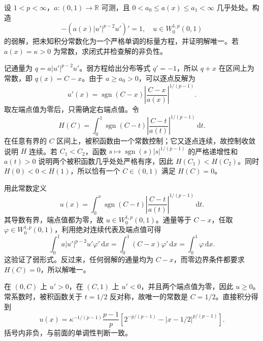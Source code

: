 \begin{exercise}\label{b2:ex:H2-ordered-source}
设 \(1<p<\infty\)，\(a:(0,1)\to\mathbb R\) 可测，且
\(0<a_0\le a(x)\le a_1<\infty\) 几乎处处。构造
\[
 -(a(x)|u'|^{p-2}u')'=1,
 \quad u\in W_0^{1,p}(0,1)
\]
的弱解，把未知积分常数化为一个严格单调的标量方程，并证明解唯一。若 \(a(x)=\kappa>0\) 为常数，求闭式并检查解的非负性。
\end{exercise}
\begin{solution}
记通量为 \(q=a|u'|^{p-2}u'\)。弱方程给出分布等式 \(q'=-1\)，所以 \(q+x\) 在区间上为常数，即 \(q(x)=C-x\)。由于 \(a\ge a_0>0\)，可以逐点反解为
\[
 u'(x)=\operatorname{sgn}(C-x)
       \left|\frac{C-x}{a(x)}\right|^{1/(p-1)}.
\]
取左端点值为零后，只需确定右端点值。令
\[
 H(C)=\int_0^1\operatorname{sgn}(C-t)
                   \left|\frac{C-t}{a(t)}\right|^{1/(p-1)}\,\mathrm dt.
\]
在任意有界的 \(C\) 区间上，被积函数由一个常数控制；它又逐点连续，故控制收敛说明 \(H\) 连续。若 \(C_1<C_2\)，函数 \(s\mapsto\operatorname{sgn}(s)|s|^{1/(p-1)}\) 的严格递增性和 \(a(t)>0\) 说明两个被积函数几乎处处严格有序，因此 \(H(C_1)<H(C_2)\)。同时 \(H(0)<0<H(1)\)，所以恰有一个 \(C\in(0,1)\) 满足 \(H(C)=0\)。

用此常数定义
\[
 u(x)=\int_0^x\operatorname{sgn}(C-t)
                   \left|\frac{C-t}{a(t)}\right|^{1/(p-1)}\,\mathrm dt.
\]
其导数有界，端点值都为零，故 \(u\in W_0^{1,p}(0,1)\)。通量等于 \(C-x\)，任取 \(\varphi\in W_0^{1,p}(0,1)\)，利用绝对连续代表及端点值可得
\[
 \int_0^1a|u'|^{p-2}u'\varphi'\,\mathrm dx
 =\int_0^1(C-x)\varphi'\,\mathrm dx
 =\int_0^1\varphi\,\mathrm dx.
\]
这验证了弱形式。反过来，任何弱解的通量均为 \(C-x\)，而零边界条件都要求 \(H(C)=0\)，所以解唯一。

在 \((0,C)\) 上 \(u'>0\)，在 \((C,1)\) 上 \(u'<0\)，并且两个端点值为零，因此 \(u\ge0\)。常系数时，被积函数关于 \(t=1/2\) 反对称，故唯一的常数是 \(C=1/2\)。直接积分得到
\[
 u(x)=\kappa^{-1/(p-1)}\frac{p-1}{p}
       \left[2^{-p/(p-1)}-|x-1/2|^{p/(p-1)}\right].
\]
括号内非负，与前面的单调性判断一致。
\end{solution}

